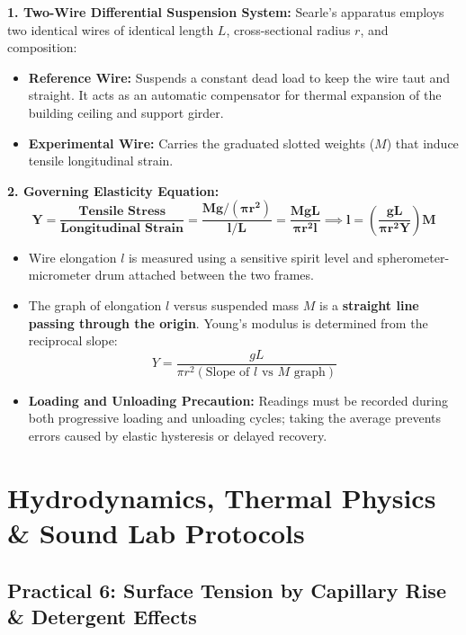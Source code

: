 \documentclass[10pt,twoside,openright]{book}
\begin{document}
\begin{conceptbox}
\textbf{1. Two-Wire Differential Suspension System:}
Searle's apparatus employs two identical wires of identical length $L$, cross-sectional radius $r$, and composition:
\begin{itemize}
  \item \textbf{Reference Wire:} Suspends a constant dead load to keep the wire taut and straight. It acts as an automatic compensator for thermal expansion of the building ceiling and support girder.
  \item \textbf{Experimental Wire:} Carries the graduated slotted weights ($M$) that induce tensile longitudinal strain.
\end{itemize}
\textbf{2. Governing Elasticity Equation:}
\begin{equation}
  \mathbf{Y = \frac{\text{Tensile Stress}}{\text{Longitudinal Strain}} = \frac{M g / (\pi r^2)}{l / L} = \frac{M g L}{\pi r^2 l}} \implies \mathbf{l = \left(\frac{g L}{\pi r^2 Y}\right) M}
\end{equation}
\begin{itemize}
  \item Wire elongation $l$ is measured using a sensitive spirit level and spherometer-micrometer drum attached between the two frames.
  \item The graph of elongation $l$ versus suspended mass $M$ is a \textbf{straight line passing through the origin}. Young's modulus is determined from the reciprocal slope:
  \begin{equation}
    Y = \frac{g L}{\pi r^2 (\text{Slope of } l \text{ vs } M \text{ graph})}
  \end{equation}
  \item \textbf{Loading and Unloading Precaution:} Readings must be recorded during both progressive loading and unloading cycles; taking the average prevents errors caused by elastic hysteresis or delayed recovery.
\end{itemize}
\end{conceptbox}

\section{Hydrodynamics, Thermal Physics \& Sound Lab Protocols}

\subsection{Practical 6: Surface Tension by Capillary Rise \& Detergent Effects}
\end{document}
